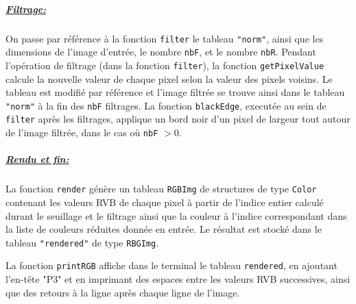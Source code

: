 \documentclass[a4paper, 11pt]{article}
\begin{document}
\subparagraph{\underline{\textit{Filtrage:}}} On passe par référence à la fonction \texttt{filter} le tableau \texttt{"norm"}, ainsi que les dimensions de l'image d'entrée, le nombre \texttt{nbF}, et le nombre \texttt{nbR}. Pendant l'opération de filtrage (dans la fonction \texttt{filter}), la fonction \texttt{getPixelValue} calcule la nouvelle valeur de chaque pixel selon la valeur des pixels voisins. Le tableau est modifié par référence et l'image filtrée se trouve ainsi dans le tableau \texttt{"norm"} à la fin des \texttt{nbF} filtrages. La fonction \texttt{blackEdge}, executée au sein de \texttt{filter} après les filtrages, applique un bord noir d'un pixel de largeur tout autour de l'image filtrée, dans le cas où \texttt{nbF} $> 0$.

\subparagraph{\underline{\textit{Rendu et fin:}}} La fonction \texttt{render} génère un tableau \texttt{RGBImg} de structures de type \texttt{Color} contenant les valeurs RVB de chaque pixel à partir de l'indice entier calculé durant le seuillage et le filtrage ainsi que la couleur à l'indice correspondant dans la liste de couleurs réduites donnée en entrée. Le résultat est stocké dans le tableau \texttt{"rendered"} de type \texttt{RBGImg}.

La fonction \texttt{printRGB} affiche dans le terminal le tableau \texttt{rendered}, en ajoutant l'en-tête "P3" et en imprimant des espaces entre les valeurs RVB successives, ainsi que des retours à la ligne après chaque ligne de l'image.

\newpage
\end{document}
